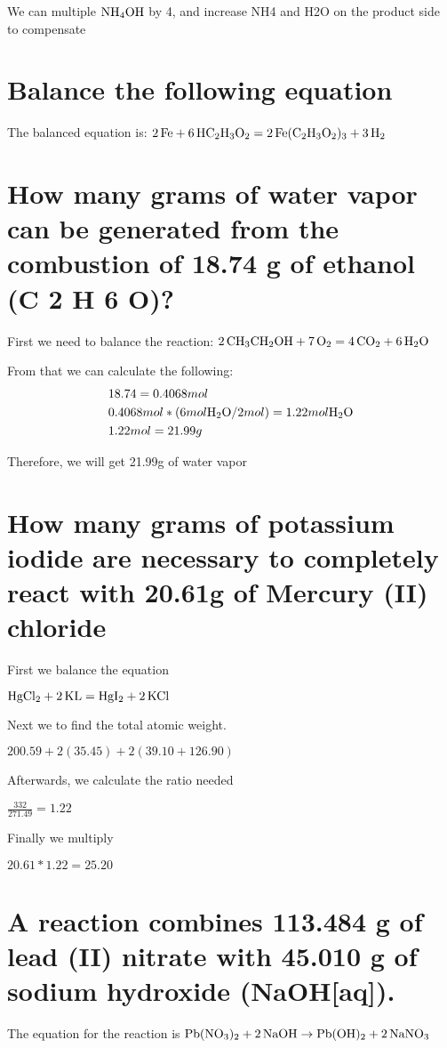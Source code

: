 \documentclass{scrartcl}
\begin{document}
We can multiple \(\ce{NH4OH}\) by 4, and increase NH4 and H2O on the product side to compensate

\section{Balance the following equation}
\label{sec:orgb58f11d}
The balanced equation is:
\(\ce{2Fe}+\ce{6HC2H3O2}=\ce{2Fe(C2H3O2)3}+\ce{3H2}\)

\section{How many grams of water vapor can be generated from the combustion of 18.74 g of ethanol (C 2 H 6 O)?}
\label{sec:orgfa203ca}
First we need to balance the reaction:
\(\ce{2CH3CH2OH}+\ce{7O2}=\ce{4CO2}+\ce{6H2O}\)

From that we can calculate the following:
\begin{align*}
&18.74=0.4068 mol\\
&0.4068 mol * (6 mol \ce{H2O}/2 mol) = 1.22 mol \ce{H2O}\\
&1.22 mol = 21.99 g
\end{align*}

Therefore, we will get 21.99g of water vapor

\section{How many grams of potassium iodide are necessary to completely react with 20.61g of Mercury (II) chloride}
\label{sec:org7b0335c}
First we balance the equation

\(\ce{HgCl2}+\ce{2KL}=\ce{HgI2}+\ce{2KCl}\)

Next we to find the total atomic weight.

\(200.59+2(35.45)+2(39.10+126.90)\)

Afterwards, we calculate the ratio needed

\(\frac{332}{271.49}=1.22\)

Finally we multiply

\(20.61*1.22=25.20\)

\section{A reaction combines 113.484 g of lead (II) nitrate with 45.010 g of sodium hydroxide (NaOH[aq]).}
\label{sec:org9a529b9}
The equation for the reaction is
\(\ce{Pb(NO3)2}+\ce{2NaOH}\rightarrow\ce{Pb(OH)2}+\ce{2NaNO3}\)
\end{document}
